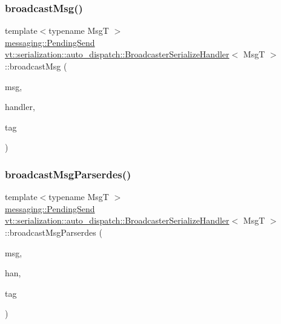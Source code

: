 \subsubsection{\texorpdfstring{broadcast\+Msg()}{broadcastMsg()}}
{\footnotesize\ttfamily template$<$typename MsgT $>$ \\
\hyperlink{structvt_1_1messaging_1_1_pending_send}{messaging\+::\+Pending\+Send} \hyperlink{structvt_1_1serialization_1_1auto__dispatch_1_1_broadcaster_serialize_handler}{vt\+::serialization\+::auto\+\_\+dispatch\+::\+Broadcaster\+Serialize\+Handler}$<$ MsgT $>$\+::broadcast\+Msg (\begin{DoxyParamCaption}\item[{MsgT $\ast$}]{msg,  }\item[{\hyperlink{namespacevt_af64846b57dfcaf104da3ef6967917573}{Handler\+Type} const \&}]{handler,  }\item[{\hyperlink{namespacevt_a84ab281dae04a52a4b243d6bf62d0e52}{Tag\+Type} const \&}]{tag }\end{DoxyParamCaption})\hspace{0.3cm}{\ttfamily [static]}}

\mbox{\label{structvt_1_1serialization_1_1auto__dispatch_1_1_broadcaster_serialize_handler_a0d8d668c01e0fff7ef3334cbc16e079a}} 
\subsubsection{\texorpdfstring{broadcast\+Msg\+Parserdes()}{broadcastMsgParserdes()}}
{\footnotesize\ttfamily template$<$typename MsgT $>$ \\
\hyperlink{structvt_1_1messaging_1_1_pending_send}{messaging\+::\+Pending\+Send} \hyperlink{structvt_1_1serialization_1_1auto__dispatch_1_1_broadcaster_serialize_handler}{vt\+::serialization\+::auto\+\_\+dispatch\+::\+Broadcaster\+Serialize\+Handler}$<$ MsgT $>$\+::broadcast\+Msg\+Parserdes (\begin{DoxyParamCaption}\item[{MsgT $\ast$}]{msg,  }\item[{\hyperlink{namespacevt_af64846b57dfcaf104da3ef6967917573}{Handler\+Type} const \&}]{han,  }\item[{\hyperlink{namespacevt_a84ab281dae04a52a4b243d6bf62d0e52}{Tag\+Type} const \&}]{tag }\end{DoxyParamCaption})\hspace{0.3cm}{\ttfamily [static]}}



